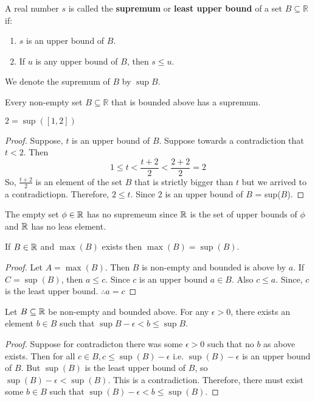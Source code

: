 \documentclass[11pt]{article}
\begin{document}
\begin{definition}
	A real number \(s\) is called the \textbf{supremum} or \textbf{least upper bound} of a set \(B \subseteq \mathbb{R}\) if:
	\begin{enumerate}
		\item \(s\) is an upper bound of \(B\).
		\item If \(u\) is any upper bound of \(B\), then \(s \leq u\).
	\end{enumerate}
	We denote the supremum of \(B\) by \(\sup B\).
\end{definition}

\begin{theorem}
	Every non-empty set \(B \subseteq \mathbb{R}\) that is bounded above has a supremum.
\end{theorem}

\begin{example}
	\(2 = \sup([1, 2])\)
\end{example}
\begin{proof}
	Suppose, \(t\) is an upper bound of \(B\). Suppose towards a contradiction that \(t < 2\). Then \[1 \leqslant t < \frac{t + 2}{2} < \frac{2 + 2}{2} = 2\]
	So, \(\frac{t + 2}{2}\) is an element of the set \(B\) that is strictly bigger
	than \(t\) but we arrived to a contradictiopn. Therefore, \(2 \leqslant t\).
	Since \(2\) is an upper bound of \(B\) = sup(\(B\)).
\end{proof}

\begin{example}
	The empty set \(\phi \in \mathbb R\) has no supremeum since \(\mathbb R\) is the set of upper bounds of \(\phi\) and \(\mathbb R\) has no leas element.
\end{example}

\begin{proposition}
	If \(B \in \mathbb R\) and \(\max(B)\) exists then \(\max(B) = \sup(B)\).
\end{proposition}

\begin{proof}
	Let \(A = \max(B)\). Then \( B\) is non-empty and bounded is above by \(a\). If \(C = \sup(B)\), then \(a \leq c\). Since \(c\) is an upper bound \(a \in B\). Also \(c \leqslant a\). Since, \(c\) is the least upper bound. \(\therefore a = c\)
\end{proof}

\begin{proposition}
	Let \(B \subseteq \mathbb R\) be non-empty and bounded above. For any \(\epsilon > 0\), there exists an element \(b \in B\) such that \(\sup B - \epsilon < b \leq \sup B\).
\end{proposition}
\begin{proof}
	Suppose for contradicton there was some \(\epsilon > 0\) such that no \(b\) as above exists. Then for all \(c \in B, c \leqslant \sup(B) - \epsilon\) i.e. \(\sup(B) - \epsilon\) is an upper bound of \(B\). But \(\sup(B)\) is the least upper bound of \(B\), so \(\sup(B) - \epsilon < \sup(B)\). This is a contradiction. Therefore, there must exist some \(b \in B\) such that \(\sup(B) - \epsilon < b \leq \sup(B)\).
\end{proof}
\end{document}
